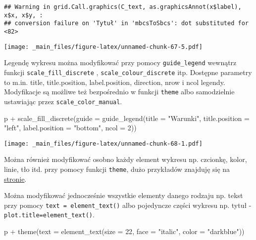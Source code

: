 \documentclass[
]{book}
\newenvironment{Shaded}{\begin{snugshade}}{\end{snugshade}}
\newcommand{\AttributeTok}[1]{\textcolor[rgb]{0.77,0.63,0.00}{#1}}
\newcommand{\DecValTok}[1]{\textcolor[rgb]{0.00,0.00,0.81}{#1}}
\newcommand{\FunctionTok}[1]{\textcolor[rgb]{0.00,0.00,0.00}{#1}}
\newcommand{\NormalTok}[1]{#1}
\newcommand{\SpecialCharTok}[1]{\textcolor[rgb]{0.00,0.00,0.00}{#1}}
\newcommand{\StringTok}[1]{\textcolor[rgb]{0.31,0.60,0.02}{#1}}
\begin{document}
\begin{verbatim}
## Warning in grid.Call.graphics(C_text, as.graphicsAnnot(x$label), x$x, x$y, :
## conversion failure on 'Tytuł' in 'mbcsToSbcs': dot substituted for <82>
\end{verbatim}

\texttt{[image: \_main\_files/figure-latex/unnamed-chunk-67-5.pdf]}

Legendę wykresu można modyfikować przy pomocy \texttt{guide\_legend} wewnątrz funkcji \texttt{scale\_fill\_discrete} , \texttt{scale\_colour\_discrete} itp. Dostępne parametry to m.in. title, title.position, label.position, direction, nrow i ncol legendy. Modyfikacje są możliwe też bezpośrednio w funkcji \texttt{theme} albo samodzielnie ustawiając przez \texttt{scale\_color\_manual}.

\begin{Shaded}
\begin{Highlighting}[]
\NormalTok{p }\SpecialCharTok{+} \FunctionTok{scale\_fill\_discrete}\NormalTok{(}\AttributeTok{guide =} \FunctionTok{guide\_legend}\NormalTok{(}\AttributeTok{title =} \StringTok{"Warunki"}\NormalTok{, }
                                           \AttributeTok{title.position =} \StringTok{"left"}\NormalTok{, }
                                           \AttributeTok{label.position =} \StringTok{"bottom"}\NormalTok{, }\AttributeTok{ncol =} \DecValTok{2}\NormalTok{))}
\end{Highlighting}
\end{Shaded}

\texttt{[image: \_main\_files/figure-latex/unnamed-chunk-68-1.pdf]}

Można również modyfikować osobno każdy element wykresu np. czcionkę, kolor, linie, tło itd. przy pomocy funkcji \texttt{theme}, dużo przykładów znajduję się na \href{http://docs.ggplot2.org/current/theme.html}{stronie}.

Można modyfikować jednocześnie wszystkie elementy danego rodzaju np. tekst przy pomocy \texttt{text\ =\ element\_text()} albo pojedyncze części wykresu np. tytuł - \texttt{plot.title=element\_text()}.

\begin{Shaded}
\begin{Highlighting}[]
\NormalTok{p }\SpecialCharTok{+} \FunctionTok{theme}\NormalTok{(}\AttributeTok{text =} \FunctionTok{element\_text}\NormalTok{(}\AttributeTok{size =} \DecValTok{22}\NormalTok{, }\AttributeTok{face =} \StringTok{"italic"}\NormalTok{, }\AttributeTok{color =} \StringTok{"darkblue"}\NormalTok{))}
\end{Highlighting}
\end{Shaded}
\end{document}
